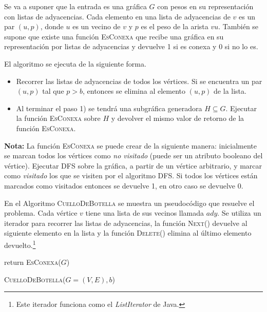 \documentclass{article}
\begin{document}
Se va a suponer que la entrada es una gráfica $G$ con pesos en su representación con listas de adyacencias. Cada elemento en una lista de adyacencias de $v$ es un par $(u,p)$, donde $u$ es un vecino de $v$ y $p$ es el peso de la arista $vu$. También se supone que existe una función \textsc{EsConexa} que recibe una gráfica en su representación por listas de adyacencias y devuelve 1 si es conexa y 0 si no lo es.

El algoritmo se ejecuta de la siguiente forma.

\begin{itemize}
\item[1)] Recorrer las listas de adyacencias de todos los vértices. Si se encuentra un par $(u,p)$ tal que $p > b$, entonces se elimina al elemento $(u,p)$ de la lista.
\item[2)] Al terminar el paso 1) se tendrá una subgráfica generadora $H \subseteq G$. Ejecutar la función \textsc{EsConexa} sobre $H$ y devolver el mismo valor de retorno de la función \textsc{EsConexa}.
\end{itemize}

\textbf{Nota:} La función \textsc{EsConexa} se puede crear de la siguiente manera: inicialmente se marcan todos los vértices como \textit{no visitado} (puede ser un atributo booleano del vértice). Ejecutar DFS sobre la gráfica, a partir de un vértice arbitrario, y marcar como \textit{visitado} los que se visiten por el algoritmo DFS. Si todos los vértices están marcados como visitados entonces se devuelve 1, en otro caso se devuelve 0.

En el Algoritmo \textsc{CuelloDeBotella} se muestra un pseudocódigo que resuelve el problema. Cada vértice $v$ tiene una lista de sus vecinos llamada $ady$. Se utiliza un iterador para recorrer las listas de adyacencias, la función \textsc{Next()} devuelve al siguiente elemento en la lista y la función \textsc{Delete()} elimina al último elemento devuelto.\footnote{Este iterador funciona como el \textit{ListIterator} de Java.}

\begin{algorithm}[htbp]
return \textsc{EsConexa}($G$)\;
\caption{\textsc{CuelloDeBotella($G=(V,E), b$)}}

\end{algorithm}
\end{document}
